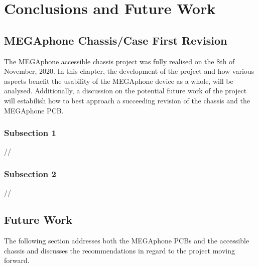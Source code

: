 
\chapter{Conclusions and Future Work} %

\label{Chapter5} %


\section{MEGAphone Chassis/Case First Revision}
The MEGAphone accessible chassis project was fully realised on the 8th of November, 2020. 
In this chapter, the development of the project and how various aspects benefit the usability of the MEGAphone device as a whole, will be analysed.
Additionally, a discussion on the potential future work of the project will estabilish how to best approach a succeeding revision of the chassis and the MEGAphone PCB.


\subsection{Subsection 1}
//


\subsection{Subsection 2}
//



\section{Future Work}
The following section addresses both the MEGAphone PCBs and the accessible chassis and discusses the recommendations in regard to the project moving forward.

